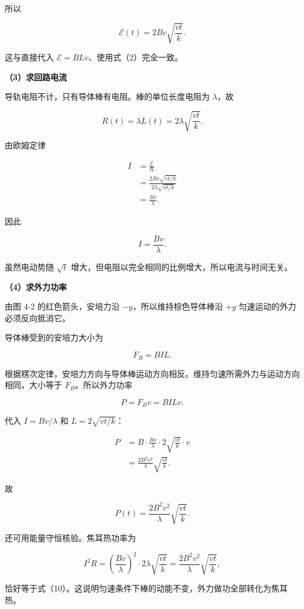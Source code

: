 \documentclass[12pt,a4paper,UTF8]{ctexart}
\begin{document}
所以

\[
\boxed{\mathcal E(t)=2Bv\sqrt{\frac{vt}{k}}}.
\tag{6}
\]

这与直接代入 \(\mathcal E=BLv\)、使用式（2）完全一致。

\textbf{（3）求回路电流}

导轨电阻不计，只有导体棒有电阻。棒的单位长度电阻为 \(\lambda\)，故

\[
R(t)=\lambda L(t)=2\lambda\sqrt{\frac{vt}{k}}.
\tag{7}
\]

由欧姆定律

\[
\begin{aligned}
I
&=\frac{\mathcal E}{R}\\
&=\frac{2Bv\sqrt{vt/k}}{2\lambda\sqrt{vt/k}}\\
&=\frac{Bv}{\lambda}.
\end{aligned}
\]

因此

\[
\boxed{I=\frac{Bv}{\lambda}}.
\tag{8}
\]

虽然电动势随 \(\sqrt t\)
增大，但电阻以完全相同的比例增大，所以电流与时间无关。

\textbf{（4）求外力功率}

由图 4-2 的红色箭头，安培力沿 \(-y\)，所以维持棕色导体棒沿 \(+y\)
匀速运动的外力必须反向抵消它。

导体棒受到的安培力大小为

\[
F_B=BIL.
\tag{9}
\]

根据楞次定律，安培力方向与导体棒运动方向相反。维持匀速所需外力与运动方向相同，大小等于
\(F_B\)。所以外力功率

\[
P=F_Bv=BILv.
\]

代入 \(I=Bv/\lambda\) 和 \(L=2\sqrt{vt/k}\)：

\[
\begin{aligned}
P
&=B\cdot\frac{Bv}{\lambda}\cdot2\sqrt{\frac{vt}{k}}\cdot v\\
&=\frac{2B^2v^2}{\lambda}\sqrt{\frac{vt}{k}}.
\end{aligned}
\]

故

\[
\boxed{P(t)=\frac{2B^2v^2}{\lambda}\sqrt{\frac{vt}{k}}}.
\tag{10}
\]

还可用能量守恒核验。焦耳热功率为

\[
I^2R
=\left(\frac{Bv}{\lambda}\right)^2
\cdot2\lambda\sqrt{\frac{vt}{k}}
=\frac{2B^2v^2}{\lambda}\sqrt{\frac{vt}{k}},
\]

恰好等于式（10）。这说明匀速条件下棒的动能不变，外力做功全部转化为焦耳热。
\end{document}
